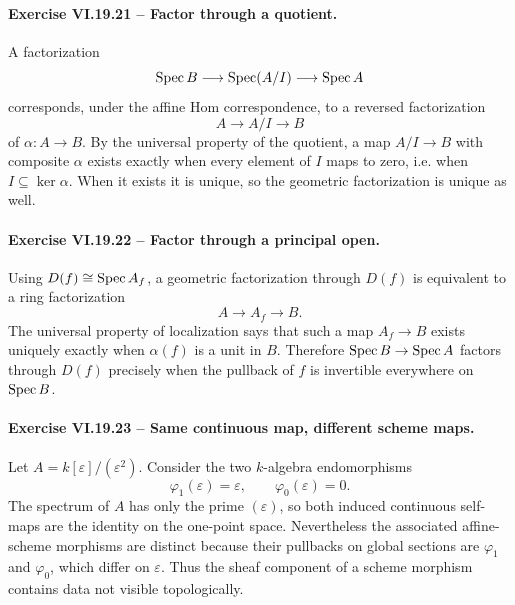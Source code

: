 \paragraph{Exercise VI.19.21 -- Factor through a quotient.}
\begin{solution}
A factorization
\[
\operatorname{Spec} B\longrightarrow\operatorname{Spec}(A/I)\longrightarrow\operatorname{Spec} A
\]
corresponds, under the affine Hom correspondence, to a reversed factorization
\[
A\longrightarrow A/I\longrightarrow B
\]
of \(\alpha:A\to B\).  By the universal property of the quotient, a map \(A/I\to B\) with composite \(\alpha\) exists exactly when every element of \(I\) maps to zero, i.e. when \(I\subseteq\ker\alpha\).  When it exists it is unique, so the geometric factorization is unique as well.
\end{solution}

\paragraph{Exercise VI.19.22 -- Factor through a principal open.}
\begin{solution}
Using \(D(f)\cong\operatorname{Spec} A_f\), a geometric factorization through \(D(f)\) is equivalent to a ring factorization
\[
A\longrightarrow A_f\longrightarrow B.
\]
The universal property of localization says that such a map \(A_f\to B\) exists uniquely exactly when \(\alpha(f)\) is a unit in \(B\).  Therefore \(\operatorname{Spec} B\to\operatorname{Spec} A\) factors through \(D(f)\) precisely when the pullback of \(f\) is invertible everywhere on \(\operatorname{Spec} B\).
\end{solution}

\paragraph{Exercise VI.19.23 -- Same continuous map, different scheme maps.}
\begin{solution}
Let \(A=k[\varepsilon]/(\varepsilon^2)\).  Consider the two \(k\)-algebra endomorphisms
\[
\varphi_1(\varepsilon)=\varepsilon,
\qquad
\varphi_0(\varepsilon)=0.
\]
The spectrum of \(A\) has only the prime \((\varepsilon)\), so both induced continuous self-maps are the identity on the one-point space.  Nevertheless the associated affine-scheme morphisms are distinct because their pullbacks on global sections are \(\varphi_1\) and \(\varphi_0\), which differ on \(\varepsilon\).  Thus the sheaf component of a scheme morphism contains data not visible topologically.
\end{solution}

